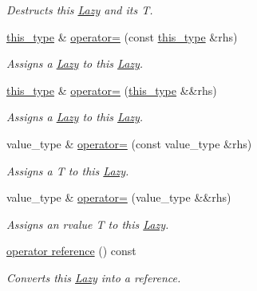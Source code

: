 \begin{DoxyCompactItemize}
\begin{DoxyCompactList}\small\item\em Destructs this {\ttfamily \hyperlink{classlazy_1_1_lazy}{Lazy}} and it\textquotesingle{}s {\ttfamily T}. \end{DoxyCompactList}\item 
\hyperlink{classlazy_1_1_lazy}{this\+\_\+type} \& \hyperlink{classlazy_1_1_lazy_a044d5db33f16f69eacf89ac15ecf1496}{operator=} (const \hyperlink{classlazy_1_1_lazy}{this\+\_\+type} \&rhs)
\begin{DoxyCompactList}\small\item\em Assigns a {\ttfamily \hyperlink{classlazy_1_1_lazy}{Lazy}} to this {\ttfamily \hyperlink{classlazy_1_1_lazy}{Lazy}}. \end{DoxyCompactList}\item 
\hyperlink{classlazy_1_1_lazy}{this\+\_\+type} \& \hyperlink{classlazy_1_1_lazy_acce1cbcc4455582ae3e4c76b3fb37124}{operator=} (\hyperlink{classlazy_1_1_lazy}{this\+\_\+type} \&\&rhs)
\begin{DoxyCompactList}\small\item\em Assigns a {\ttfamily \hyperlink{classlazy_1_1_lazy}{Lazy}} to this {\ttfamily \hyperlink{classlazy_1_1_lazy}{Lazy}}. \end{DoxyCompactList}\item 
value\+\_\+type \& \hyperlink{classlazy_1_1_lazy_af19a255ca5b3def40a42319a7b33a29a}{operator=} (const value\+\_\+type \&rhs)
\begin{DoxyCompactList}\small\item\em Assigns a {\ttfamily T} to this {\ttfamily \hyperlink{classlazy_1_1_lazy}{Lazy}}. \end{DoxyCompactList}\item 
value\+\_\+type \& \hyperlink{classlazy_1_1_lazy_a474377180319d366e140431c1182a407}{operator=} (value\+\_\+type \&\&rhs)
\begin{DoxyCompactList}\small\item\em Assigns an rvalue {\ttfamily T} to this {\ttfamily \hyperlink{classlazy_1_1_lazy}{Lazy}}. \end{DoxyCompactList}\item 
\hyperlink{classlazy_1_1_lazy_af6e6b1babd6c4f34a30f27d20494afdf}{operator reference} () const 
\begin{DoxyCompactList}\small\item\em Converts this {\ttfamily \hyperlink{classlazy_1_1_lazy}{Lazy}} into a reference. \end{DoxyCompactList}\item 

\end{DoxyCompactItemize}

